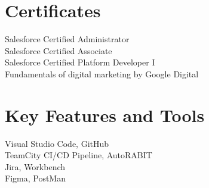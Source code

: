 \begin{minipage}[t]{0.48\textwidth}
\section*{Certificates}
\small{
{Salesforce Certified Administrator}\\
{Salesforce Certified Associate}\\
{Salesforce Certified Platform Developer I}\\
{Fundamentals of digital marketing by Google Digital}}
\end{minipage}\hfill
\begin{minipage}[t]{0.02\textwidth}
\hspace{0.02pt}
\end{minipage}\hfill
\begin{minipage}[t]{0.5\textwidth}
\section*{Key Features and Tools}
\small{{Visual Studio Code, GitHub}\\
{TeamCity CI/CD Pipeline, AutoRABIT}\\
{Jira, Workbench}\\
{Figma, PostMan}}
\end{minipage}\hfill